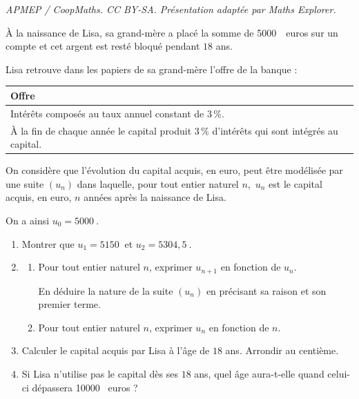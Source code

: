 \documentclass[10pt]{article}
\providecommand{\np}[2][]{{#2~#1}}
\begin{document}
\noindent\textit{APMEP / CoopMaths. CC BY-SA. Présentation adaptée par Maths Explorer.}\par\medskip
\medskip

À la naissance de Lisa, sa grand-mère a placé la somme de \np{5000}~euros sur un compte et cet argent est resté bloqué pendant $18$ ans.

Lisa retrouve dans les papiers de sa grand-mère l'offre de la banque :

\begin{center}
\begin{tabularx}{\linewidth}{|X|}\hline
\textbf{Offre}\\ \hline
Intérêts composés au taux annuel constant de 3\,\%.\\
À la fin de chaque année le capital produit 3\,\% d'intérêts qui sont intégrés au capital.\\ \hline
\end{tabularx}
\end{center}

On considère que l'évolution du capital acquis, en euro, peut être modélisée par une suite 
$\left(u_n\right)$ dans laquelle, pour tout entier naturel $n$,\, $u_n$ est le capital acquis, en euro, $n$ années après la naissance de Lisa.

On a ainsi $u_0 = \np{5000}$.

\medskip

\begin{enumerate}
\item Montrer que $u_1 = \np{5150}$ et $u_2 = \np{5304,5}$. 
\item 
	\begin{enumerate}
		\item Pour tout entier naturel $n$, exprimer $u_{n+1}$ en fonction de $u_n$. 
		
En déduire la nature de la suite $\left(u_n\right)$  en précisant sa raison et son premier terme.
		\item Pour tout entier naturel $n$, exprimer $u_n$ en fonction de $n$.
	\end{enumerate}
\item  Calculer le capital acquis par Lisa à l'âge de $18$ ans. Arrondir au centième.
\item  Si Lisa n'utilise pas le capital dès ses $18$ ans, quel âge aura-t-elle quand celui-ci dépassera \np{10000} euros ?
\end{enumerate}

\bigskip
\end{document}

